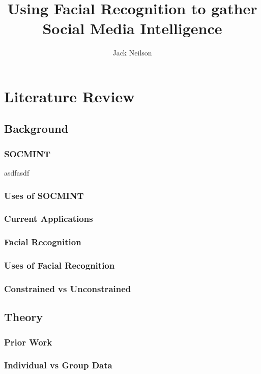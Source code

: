 \documentclass{article}
\begin{document}
\title{Using Facial Recognition to gather Social Media Intelligence}
\author{Jack Neilson}
\maketitle
\newpage
\section{Literature Review}
\subsection{Background}
\todo{}

\subsubsection{SOCMINT}
asdfasdf \citep{criminalvshumint}

\subsubsection{Uses of SOCMINT}

\subsubsection{Current Applications}

\subsubsection{Facial Recognition}

\subsubsection{Uses of Facial Recognition}

\subsubsection{Constrained vs Unconstrained}

\subsection{Theory}
\subsubsection{Prior Work}

\subsubsection{Individual vs Group Data}
\end{document}
